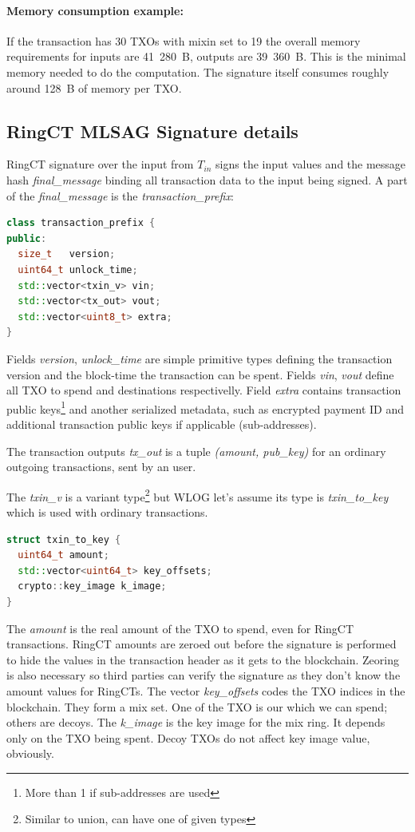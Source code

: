 \documentclass[]{article}
\begin{document}
\paragraph{Memory consumption example:}
If the transaction has 30 TXOs with mixin set to 19 the overall memory requirements for inputs are 41~280~B, outputs are 39~360~B. This is the minimal memory needed to do the computation. The signature itself consumes roughly around 128~B of memory per TXO.

\subsection{RingCT MLSAG Signature details}

RingCT signature over the input from $T_{in}$ signs the input values and the message hash \emph{final\_message} binding all transaction data to the input being signed. A part of the \emph{final\_message} is the \emph{transaction\_prefix}:

\begin{lstlisting}[language=c++]
class transaction_prefix {
public:
  size_t   version;
  uint64_t unlock_time;  
  std::vector<txin_v> vin;
  std::vector<tx_out> vout;
  std::vector<uint8_t> extra;
}
\end{lstlisting}

Fields \emph{version}, \emph{unlock\_time} are simple primitive types defining the transaction version and the block-time the transaction can be spent. Fields \emph{vin}, \emph{vout} define all TXO to spend and destinations respectivelly. Field \emph{extra} contains transaction public keys\footnote{More than 1 if sub-addresses are used} and another serialized metadata, such as encrypted payment ID and additional transaction public keys if applicable (sub-addresses).

The transaction outputs \emph{tx\_out} is a tuple \emph{(amount, pub\_key)} for an ordinary outgoing transactions, sent by an user. 

The \emph{txin\_v} is a variant type\footnote{Similar to union, can have one of given types} but WLOG let's assume its type is \emph{txin\_to\_key} which is used with ordinary transactions. 

\begin{lstlisting}[language=c++]
struct txin_to_key {
  uint64_t amount;
  std::vector<uint64_t> key_offsets;
  crypto::key_image k_image;
}
\end{lstlisting}

The \emph{amount} is the real amount of the TXO to spend, even for RingCT transactions. RingCT amounts are zeroed out before the signature is performed to hide the values in the transaction header as it gets to the blockchain. Zeoring is also necessary so third parties can verify the signature as they don't know the amount values for RingCTs.
The vector \emph{key\_offsets} codes the TXO indices in the blockchain. They form a mix set. One of the TXO is our which we can spend; others are decoys.
The \emph{k\_image} is the key image for the mix ring. It depends only on the TXO being spent. Decoy TXOs do not affect key image value, obviously.
\end{document}
